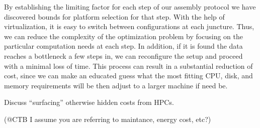 \documentclass[11pt]{article}
\begin{document}
By establishing the limiting factor for each step of our assembly protocol 
we have discovered bounds for platform selection for that step. With the help
of virtualization, it is easy to switch between configurations at each 
juncture. Thus, we can reduce the complexity of the optimization problem by 
focusing on the particular computation needs at each step. In addition, if it
is found the data reaches a bottleneck a few steps in, we can reconfigure the
setup and proceed with a minimal loss of time. This process can result in a 
substantial reduction of cost, since we can make an educated guess what the 
most fitting CPU, disk, and memory requirements will be then adjust to a larger
machine if need be.

Discuss ``surfacing'' otherwise hidden costs from HPCs.

(@CTB I assume you are referring to maintance, energy cost, etc?)
\end{document}
